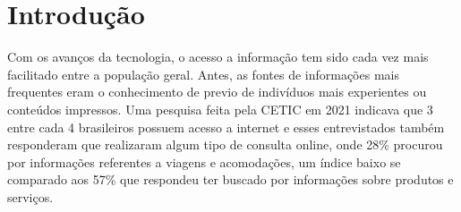 
\chapter[Introdução]{Introdução}
\label{cap:intro}
\begin{comment}
Neste capítulo precisamos:
\begin{itemize}
    \item Introduzir o contexto
    \item Definir o que entendemos como avaliação de hoteis
    \item Apresentar em linhas gerais quais métodos são usados para detectar fake news, qual o estada da arte atual e quais são suas limitações.
    \item Descrever a nossa proposta e objetivos
    \item Descrever a estrutura do relatório
\end{itemize}

\end{comment}

Com os avanços da tecnologia, o acesso a informação tem sido cada vez mais facilitado entre a população geral. Antes, as fontes de informações mais frequentes eram o conhecimento de previo de indivíduos mais experientes ou conteúdos impressos. Uma pesquisa feita pela CETIC em 2021 indicava que 3 entre cada 4 brasileiros possuem acesso a internet e esses entrevistados também responderam que realizaram algum tipo de consulta online, onde 28\% procurou por informações referentes a viagens e acomodações, um índice baixo se comparado aos 57\% que respondeu ter buscado por informações sobre produtos e serviços.


